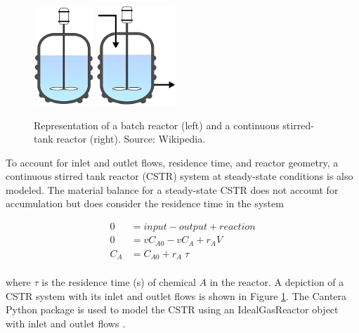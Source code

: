 \begin{figure}[H]
    \centering
    \includegraphics[width=0.2\textwidth]{figures/reactor-batch.png}
    \hspace{0.1\textwidth}
    \includegraphics[width=0.265\textwidth]{figures/reactor-cstr.png}
    \caption{Representation of a batch reactor (left) and a continuous stirred-tank reactor (right). Source: Wikipedia.}
    \label{fig:batch-cstr}
\end{figure}

To account for inlet and outlet flows, residence time, and reactor geometry, a continuous stirred tank reactor (CSTR) system at steady-state conditions is also modeled. The material balance for a steady-state CSTR does not account for accumulation but does consider the residence time in the system

\begin{equation}
    \begin{aligned}
        0 &= input - output + reaction \\
        0 &= v C_{A0} - v C_A + r_A V \\
        C_A &= C_{A0} + r_A\;\tau \\
    \end{aligned}
\end{equation}

\noindent where $\tau$ is the residence time (s) of chemical $A$ in the reactor. A depiction of a CSTR system with its inlet and outlet flows is shown in Figure \ref{fig:batch-cstr}. The Cantera Python package is used to model the CSTR using an IdealGasReactor object with inlet and outlet flows \cite{Cantera-2018}.

